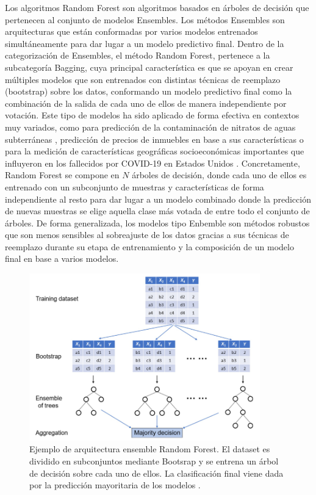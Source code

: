 \documentclass{uathesis-es}
\begin{document}
Los algoritmos Random Forest son algoritmos basados en árboles de decisión que pertenecen al conjunto de modelos Ensembles. Los métodos Ensembles son arquitecturas que están conformadas por varios modelos entrenados simultáneamente para dar lugar a un modelo predictivo final. Dentro de la categorización de Ensembles, el método Random Forest, pertenece a la subcategoría Bagging, cuya principal característica es que se apoyan en crear múltiples modelos que son entrenados con distintas técnicas de reemplazo (bootstrap) sobre los datos, conformando un modelo predictivo final como la combinación de la salida de cada uno de ellos de manera independiente por votación. Este tipo de modelos ha sido aplicado de forma efectiva en contextos muy variados, como para predicción de la contaminación de nitratos de aguas subterráneas \cite{HE2022133388}, predicción de precios de inmuebles en base a sus características \cite{ADETUNJI2022806} o para la medición de características geográficas socioeconómicas importantes que influyeron en los fallecidos por COVID-19 en Estados Unidos \cite{GREKOUSIS2022102744}. Concretamente, Random Forest se compone en $N$ árboles de decisión, donde cada uno de ellos es entrenado con un subconjunto de muestras y características de forma independiente al resto para dar lugar a un modelo combinado donde la predicción de nuevas muestras se elige aquella clase más votada de entre todo el conjunto de árboles. De forma generalizada, los modelos tipo Enbemble son métodos robustos que son menos sensibles al sobreajuste de los datos gracias a sus técnicas de reemplazo durante su etapa de entrenamiento y la composición de un modelo final en base a varios modelos.


\begin{figure}[H]
    \centering
    \includegraphics[width=10cm]{Figures/Background/RF.png}
    \caption{Ejemplo de arquitectura ensemble Random Forest. El dataset es dividido en subconjuntos mediante Bootsrap y se entrena un árbol de decisión sobre cada uno de ellos. La clasificación final viene dada por la predicción mayoritaria de los modelos \cite{MISRA2020243}.}
    \label{RF_BACKGROUND}
\end{figure}
\end{document}

